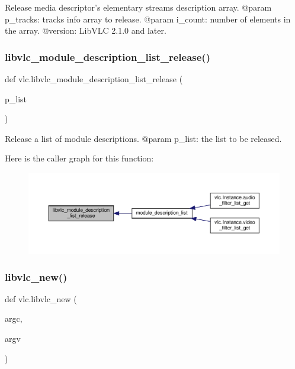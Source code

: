\begin{DoxyVerb}Release media descriptor's elementary streams description array.
@param p_tracks: tracks info array to release.
@param i_count: number of elements in the array.
@version: LibVLC 2.1.0 and later.
\end{DoxyVerb}
 \mbox{\label{namespacevlc_a3ae49966acbd43a6b3c1b286cf609912}} 
\subsubsection{\texorpdfstring{libvlc\+\_\+module\+\_\+description\+\_\+list\+\_\+release()}{libvlc\_module\_description\_list\_release()}}
{\footnotesize\ttfamily def vlc.\+libvlc\+\_\+module\+\_\+description\+\_\+list\+\_\+release (\begin{DoxyParamCaption}\item[{}]{p\+\_\+list }\end{DoxyParamCaption})}

\begin{DoxyVerb}Release a list of module descriptions.
@param p_list: the list to be released.
\end{DoxyVerb}
 Here is the caller graph for this function\+:
\nopagebreak
\begin{figure}[H]
\begin{center}
\leavevmode
\includegraphics[width=350pt]{namespacevlc_a3ae49966acbd43a6b3c1b286cf609912_icgraph}
\end{center}
\end{figure}
\mbox{\label{namespacevlc_a061db38b4ce8fdc316f730963401676c}} 
\subsubsection{\texorpdfstring{libvlc\+\_\+new()}{libvlc\_new()}}
{\footnotesize\ttfamily def vlc.\+libvlc\+\_\+new (\begin{DoxyParamCaption}\item[{}]{argc,  }\item[{}]{argv }\end{DoxyParamCaption})}

